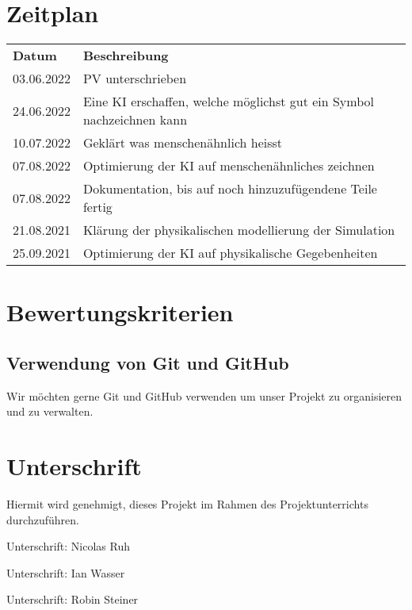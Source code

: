 \documentclass{article}
\begin{document}
\section{Zeitplan}
\label{chap:zeitplan}
\begin{table}[H]
    \begin{tabular}{ll}
    \textbf{Datum} & \textbf{Beschreibung}                                                                         \\
    03.06.2022     & PV unterschrieben                                                                             \\
    24.06.2022     & Eine KI erschaffen, welche möglichst gut ein Symbol nachzeichnen kann                         \\
    10.07.2022     & Geklärt was menschenähnlich heisst                                                            \\
    07.08.2022     & Optimierung der KI auf menschenähnliches zeichnen                                             \\
    07.08.2022     & Dokumentation, bis auf noch hinzuzufügendene Teile fertig                                     \\
    21.08.2021     & Klärung der physikalischen modellierung der Simulation                                        \\
    25.09.2021     & Optimierung der KI auf physikalische Gegebenheiten                                            \\
    \end{tabular}
\end{table}

\section{Bewertungskriterien}
\subsection{Verwendung von Git und GitHub}
\label{chap:git_github}
Wir möchten gerne Git und GitHub verwenden um unser Projekt zu organisieren und zu verwalten.

\section{Unterschrift}
\label{chap:unterschrift}

Hiermit wird genehmigt, dieses Projekt im Rahmen des Projektunterrichts
durchzuführen.

\vspace*{1cm}

Unterschrift: \hrulefill Nicolas Ruh \vspace*{2cm}

Unterschrift: \hrulefill Ian Wasser \vspace*{2cm}

Unterschrift: \hrulefill Robin Steiner \vspace*{2cm}

\printbibliography[heading=bibintoc]
\end{document}
